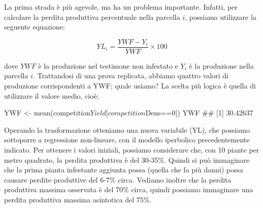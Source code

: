 \documentclass[a4paper,12pt,oneside]{book}
\newenvironment{Shaded}{}{}
\newcommand{\KeywordTok}[1]{#1}
\newcommand{\DecValTok}[1]{#1}
\newcommand{\StringTok}[1]{#1}
\newcommand{\CommentTok}[1]{#1}
\newcommand{\OperatorTok}[1]{#1}
\newcommand{\NormalTok}[1]{#1}
\begin{document}
La prima strada è più agevole, ma ha un problema importante. Infatti, per calcolare la perdita produttiva percentuale nella parcella \(i\), possiamo utilizzare la seguente equazione:

\[YL_i = \frac{YWF - Y_i}{YWF} \times 100\]

dove \(YWF\) è la produzione nel testimone non infestato e \(Y_i\) è la produzione nella parcella \(i\). Trattandosi di una prova replicata, abbiamo quattro valori di produzione corrispondenti a YWF; quale usiamo? La scelta più logica è quella di utilizzare il valore medio, cioè;

\begin{Shaded}
\begin{Highlighting}[]
\NormalTok{YWF <-}\StringTok{ }\KeywordTok{mean}\NormalTok{(competition}\OperatorTok{$}\NormalTok{Yield[competition}\OperatorTok{$}\NormalTok{Dens}\OperatorTok{==}\DecValTok{0}\NormalTok{])}
\NormalTok{YWF}
\CommentTok{## [1] 30.42637}
\end{Highlighting}
\end{Shaded}

Operando la trasformazione otteniamo una nuova variabile (YL), che possiamo sottoporre a regressione non-lineare, con il modello iperbolico precedentemente indicato. Per ottenere i valori iniziali, possiamo considerare che, con 10 piante per metro quadrato, la perdita produttiva è del 30-35\%. Quindi si può immaginare che la prima pianta infestante aggiunta possa (quella che fa più danni) possa causare perdite produttive del 6-7\% circa. Vediamo inoltre che la perdita produttiva massima osservata è del 70\% circa, quindi possiamo immaginare una perdita produttiva massima asintotica del 75\%.
\end{document}
